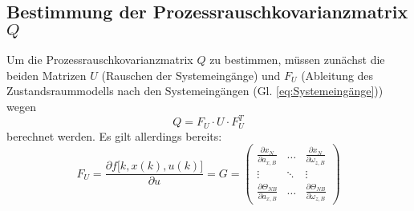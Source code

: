 \documentclass[12pt,a4paper]{article}
\begin{document}
	\subsection{Bestimmung der Prozessrauschkovarianzmatrix $Q$}\label{subsec:Prozessrauschkovarianzmatrix}
	Um die Prozessrauschkovarianzmatrix $Q$ zu bestimmen, müssen zunächst die beiden Matrizen $U$ (Rauschen der Systemeingänge) und $F_{U}$ (Ableitung des Zustandsraummodells nach den Systemeingängen (Gl. \ref{eq:Systemeingänge})) wegen
	\begin{equation}\label{eq:ZusammenhangProzessrauschkovarianzmatrix}
		Q=F_{U}\cdot U\cdot F_{U}^{T}
	\end{equation}
	berechnet werden. Es gilt allerdings bereits:
	\begin{equation}\label{eq:ZustandsmatrixAbhängigSystemeingänge}
		F_{U}=\frac{\partial f\big[k, x(k), u(k)\big]}{\partial u}=G=
		\begin{pmatrix}
		\frac{\partial x_{N}}{\partial a_{x,B}} & \ldots & \frac{\partial x_{N}}{\partial \omega_{z,B}} \\
		\vdots & \ddots & \vdots \\
		\frac{\partial \Theta_{NB}}{\partial a_{x,B}} & \ldots & \frac{\partial \Theta_{NB}}{\partial \omega_{z,B}}
		\end{pmatrix}
	\end{equation}
	
\end{document}
